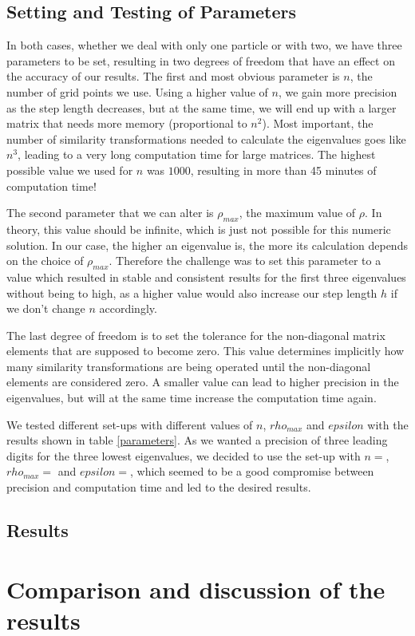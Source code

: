 \documentclass[10pt,a4paper]{article}
\begin{document}
\subsection{Setting and Testing of Parameters}
In both cases, whether we deal with only one particle or with two, we have three parameters to be set, resulting in two degrees of freedom that have an effect on the accuracy of our results. The first and most obvious parameter is $n$, the number of grid points we use. Using a higher value of $n$, we gain more precision as the step length decreases, but at the same time, we will end up with a larger matrix that needs more memory (proportional to $n^2$). Most important, the number of similarity transformations needed to calculate the eigenvalues goes like $n^3$, leading to a very long computation time for large matrices. The highest possible value we used for $n$ was $1000$, resulting in more than 45 minutes of computation time!

The second parameter that we can alter is $\rho_{max}$, the maximum value of $\rho$. In theory, this value should be infinite, which is just not possible for this numeric solution. In our case, the higher an eigenvalue is, the more its calculation depends on the choice of $\rho_{max}$. Therefore the challenge was to set this parameter to a value which resulted in stable and consistent results for the first three eigenvalues without being to high, as a higher value would also increase our step length $h$ if we don't change $n$ accordingly.

The last degree of freedom is to set the tolerance for the non-diagonal matrix elements that are supposed to become zero. This value determines implicitly how many similarity transformations are being operated until the non-diagonal elements are considered zero. A smaller value can lead to higher precision in the eigenvalues, but will at the same time increase the computation time again.

We tested different set-ups with different values of $n$, $rho_{max}$ and $epsilon$ with the results shown in table \ref{parameters}. As we wanted a precision of three leading digits for the three lowest eigenvalues, we decided to use the set-up with $n=$, $rho_{max}=$ and $epsilon=$, which seemed to be a good compromise between precision and computation time and led to the desired results.
\subsection{Results}
\section{Comparison and discussion of the results}
\end{document}
